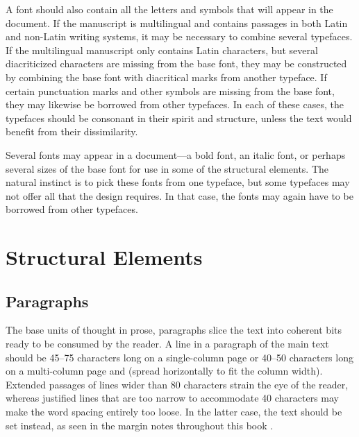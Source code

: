 A font should also contain all the letters and symbols that will appear in
the document. If the manuscript is multilingual and contains passages in both
Latin and non-Latin writing systems, it may be necessary to combine several
typefaces. If the multilingual manuscript only contains Latin characters, but
several diacriticized characters are missing from the base font, they may be
constructed by combining the base font with diacritical marks from another
typeface. If certain punctuation marks and other symbols are missing from the
base font, they may likewise be borrowed from other typefaces. In each of these
cases, the typefaces should be consonant in their spirit and structure, unless
the text would benefit from their dissimilarity.

Several fonts may appear in a document---a bold font, an italic font, or perhaps
several sizes of the base font for use in some of the structural elements. The
natural instinct is to pick these fonts from one typeface, but some typefaces
may not offer all that the design requires. In that case, the fonts may again
have to be borrowed from other typefaces.


\section{Structural Elements}
\subsection{Paragraphs}
The base units of thought in prose, paragraphs slice the text into coherent bits
ready to be consumed by the reader. A line in a paragraph of the main text
should be 45--75 characters long on a single-column page or 40--50 characters
long on a multi-column page and  (spread horizontally to fit the
column width). Extended passages of lines wider than 80 characters strain the
eye of the reader, whereas justified lines that are too narrow to accommodate 40
characters may make the word spacing entirely too loose. In the latter case, the
text should be set  instead, as seen in the margin notes throughout
this book \cite[sec.\,2.1.2]{bringhurst92}.

